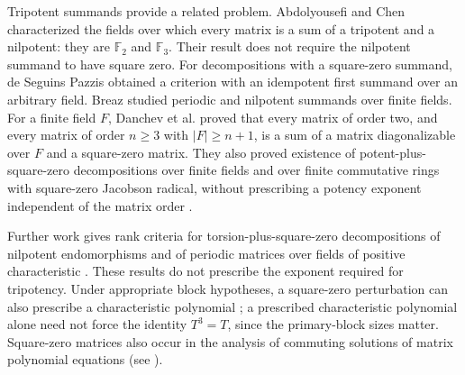 \documentclass[12pt]{amsart}
\theoremstyle{remark}
\numberwithin{equation}{section}
\theoremstyle{definition}
\newcommand{\F}{\mathbb F}
\begin{document}
Tripotent summands provide a related problem. Abdolyousefi and Chen \cite[Lemma~4.1]{AbdolyousefiChen2018} characterized the fields over which every matrix is a sum of a tripotent and a nilpotent: they are $\F_2$ and $\F_3$. Their result does not require the nilpotent summand to have square zero. For decompositions with a square-zero summand, de Seguins Pazzis \cite[Theorem~1]{Pazzis} obtained a criterion with an idempotent first summand over an arbitrary field. Breaz \cite{Breaz2018} studied periodic and nilpotent summands over finite fields. For a finite field $F$, Danchev et al. \cite[Theorem~3.6]{DGLDiagonalizable} proved that every matrix of order two, and every matrix of order $n\geq3$ with $|F|\geq n+1$, is a sum of a matrix diagonalizable over $F$ and a square-zero matrix. They also proved existence of potent-plus-square-zero decompositions over finite fields and over finite commutative rings with square-zero Jacobson radical, without prescribing a potency exponent independent of the matrix order \cite[Proposition~2.2 and Theorem~2.6]{DGLPotent}.

Further work gives rank criteria for torsion-plus-square-zero decompositions of nilpotent endomorphisms \cite[Theorem~2.2]{DGLRoots2023} and of periodic matrices over fields of positive characteristic \cite[Theorem~2.8]{DGLPeriodic2025}. These results do not prescribe the exponent required for tripotency. Under appropriate block hypotheses, a square-zero perturbation can also prescribe a characteristic polynomial \cite[Theorem~2.3]{DGLPrescribed2024}; a prescribed characteristic polynomial alone need not force the identity $T^3=T$, since the primary-block sizes matter. Square-zero matrices also occur in the analysis of commuting solutions of matrix polynomial equations (see \cite{PhucMordell}).
\end{document}
